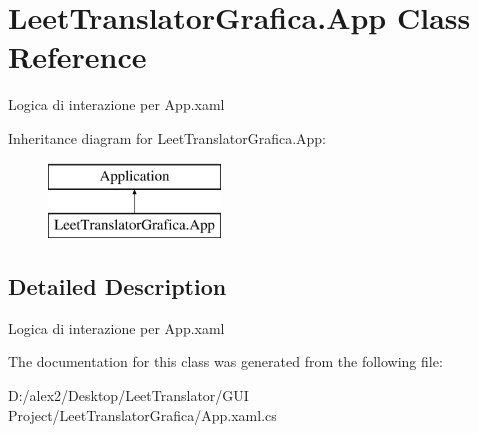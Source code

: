 \hypertarget{class_leet_translator_grafica_1_1_app}{}\section{Leet\+Translator\+Grafica.\+App Class Reference}
\label{class_leet_translator_grafica_1_1_app}


Logica di interazione per App.\+xaml  


Inheritance diagram for Leet\+Translator\+Grafica.\+App\+:\begin{figure}[H]
\begin{center}
\leavevmode
\includegraphics[height=2.000000cm]{class_leet_translator_grafica_1_1_app}
\end{center}
\end{figure}


\subsection{Detailed Description}
Logica di interazione per App.\+xaml 



The documentation for this class was generated from the following file\+:\begin{DoxyCompactItemize}
\item 
D\+:/alex2/\+Desktop/\+Leet\+Translator/\+G\+U\+I Project/\+Leet\+Translator\+Grafica/App.\+xaml.\+cs\end{DoxyCompactItemize}
